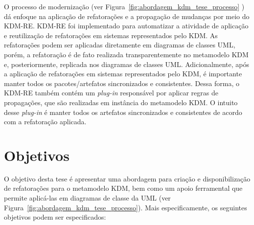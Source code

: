 O processo de modernização (ver Figura~\ref{fig:abordagem_kdm_tese_processo} ) dá enfoque na aplicação de refatorações e a propagação de mudanças por meio do KDM-RE. KDM-RE foi implementado para automatizar a atividade de aplicação e reutilização de refatorações em sistemas representados pelo KDM. As refatorações podem ser aplicadas diretamente em diagramas de classes UML, porém, a refatoração é de fato realizada transparentemente no metamodelo KDM e, posteriormente, replicada nos diagramas de classes UML. Adicionalmente, após a aplicação de refatorações em sistemas representados pelo KDM, é importante manter todos os pacotes/artefatos sincronizados e consistentes. Dessa forma, o KDM-RE também contém um \textit{plug-in} responsável por aplicar regras de propagações, que são realizadas em instância do metamodelo KDM. O intuito desse \textit{plug-in} é manter todos os artefatos sincronizados e consistentes de acordo com a refatoração aplicada.


\section{Objetivos}\label{sec:objetivos}


O objetivo desta tese é apresentar uma abordagem para criação e disponibilização de refatorações para o metamodelo KDM, bem como um apoio ferramental que permite aplicá-las em diagramas de classe da UML (ver Figura~\ref{fig:abordagem_kdm_tese_processo}). Mais especificamente, os seguintes objetivos podem ser especificados:%

